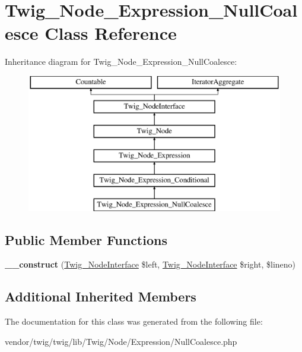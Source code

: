 \hypertarget{classTwig__Node__Expression__NullCoalesce}{}\section{Twig\+\_\+\+Node\+\_\+\+Expression\+\_\+\+Null\+Coalesce Class Reference}
\label{classTwig__Node__Expression__NullCoalesce}
Inheritance diagram for Twig\+\_\+\+Node\+\_\+\+Expression\+\_\+\+Null\+Coalesce\+:\begin{figure}[H]
\begin{center}
\leavevmode
\includegraphics[height=6.000000cm]{classTwig__Node__Expression__NullCoalesce}
\end{center}
\end{figure}
\subsection*{Public Member Functions}
\begin{DoxyCompactItemize}
\item 
{\bfseries \+\_\+\+\_\+construct} (\hyperlink{interfaceTwig__NodeInterface}{Twig\+\_\+\+Node\+Interface} \$left, \hyperlink{interfaceTwig__NodeInterface}{Twig\+\_\+\+Node\+Interface} \$right, \$lineno)\hypertarget{classTwig__Node__Expression__NullCoalesce_a6152b8fb4a9ed1a4ba97067bcaa5afb2}{}\label{classTwig__Node__Expression__NullCoalesce_a6152b8fb4a9ed1a4ba97067bcaa5afb2}

\end{DoxyCompactItemize}
\subsection*{Additional Inherited Members}


The documentation for this class was generated from the following file\+:\begin{DoxyCompactItemize}
\item 
vendor/twig/twig/lib/\+Twig/\+Node/\+Expression/Null\+Coalesce.\+php\end{DoxyCompactItemize}
